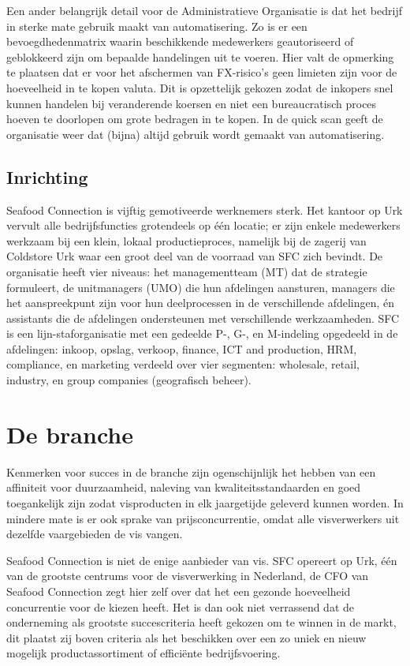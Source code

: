 \documentclass[10pt,a4paper,twoside]{report}
\begin{document}
Een ander belangrijk detail voor de Administratieve Organisatie is dat het bedrijf in sterke mate gebruik maakt van automatisering. Zo is er een bevoegdhedenmatrix waarin beschikkende medewerkers geautoriseerd of geblokkeerd zijn om bepaalde handelingen uit te voeren. Hier valt de opmerking te plaatsen dat er voor het afschermen van FX-risico's geen limieten zijn voor de hoeveelheid in te kopen valuta. Dit is opzettelijk gekozen zodat de inkopers snel kunnen handelen bij veranderende koersen en niet een bureaucratisch proces hoeven te doorlopen om grote bedragen in te kopen. In de quick scan geeft de organisatie weer dat (bijna) altijd gebruik wordt gemaakt van automatisering. \citep{quickscan}

\subsection{Inrichting}
Seafood Connection is vijftig gemotiveerde werknemers sterk. Het kantoor op Urk vervult alle bedrijfsfuncties grotendeels op één locatie; er zijn enkele medewerkers werkzaam bij een klein, lokaal productieproces, namelijk bij de zagerij van Coldstore Urk waar een groot deel van de voorraad van SFC zich bevindt. De organisatie heeft vier niveaus: het managementteam (MT) dat de strategie formuleert, de unitmanagers (UMO) die hun afdelingen aansturen, managers die het aanspreekpunt zijn voor hun deelprocessen in de verschillende afdelingen, én assistants die de afdelingen ondersteunen met verschillende werkzaamheden. SFC is een lijn-staforganisatie met een gedeelde P-, G-, en M-indeling opgedeeld in de afdelingen: inkoop, opslag, verkoop, finance, ICT and production, HRM, compliance, en marketing verdeeld over vier segmenten: wholesale, retail, industry, en group companies (geografisch beheer). \citep{quickscan}
    \section{De branche}
Kenmerken voor succes in de branche zijn ogenschijnlijk het hebben van een affiniteit voor duurzaamheid, naleving van kwaliteitsstandaarden en goed toegankelijk zijn zodat visproducten in elk jaargetijde geleverd kunnen worden. In mindere mate is er ook sprake van prijsconcurrentie, omdat alle visverwerkers uit dezelfde vaargebieden de vis vangen. 

Seafood Connection is niet de enige aanbieder van vis. SFC opereert op Urk, één van de grootste centrums voor de visverwerking in Nederland, de CFO van Seafood Connection zegt hier zelf over dat het een gezonde hoeveelheid concurrentie voor de kiezen heeft. Het is dan ook niet verrassend dat de onderneming als grootste succescriteria heeft gekozen om te winnen in de markt, dit plaatst zij boven criteria als het beschikken over een zo uniek en nieuw mogelijk productassortiment of efficiënte bedrijfsvoering. 
\end{document}
